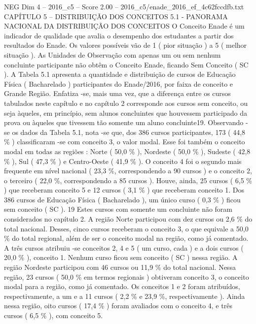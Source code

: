 \begin{textsample}{NEG Dim 4 – 2016\_c5 – Score 2.00 – 2016\_c5/enade\_2016\_ef\_4c62fccdfb.txt}  \label{ex:f4_neg_257}
CAPÍTULO 5 – DISTRIBUIÇÃO DOS CONCEITOS 5.1 - PANORAMA NACIONAL DA DISTRIBUIÇÃO DOS CONCEITOS O Conceito Enade é um indicador de qualidade que avalia o desempenho dos estudantes a partir dos resultados do Enade.
Os valores possíveis vão de 1 ( pior situação ) a 5 ( melhor situação ).
As Unidades de Observação com apenas um ou sem nenhum concluinte participante não obtêm o Conceito Enade, ficando Sem Conceito ( SC ).
A Tabela 5.1 apresenta a quantidade e distribuição de cursos de Educação Física ( Bacharelado ) participantes do Enade/2016, por faixa de conceito e Grande Região.
Enfatiza -se, mais uma vez, que a diferença entre os cursos tabulados neste capítulo e no capítulo 2 corresponde aos cursos sem conceito, ou seja àqueles, em princípio, sem alunos concluintes que houvessem participado da prova ou àqueles que tivessem tão somente um aluno concluinte19.
Observando -se os dados da Tabela 5.1, nota -se que, dos 386 cursos participantes, 173 ( 44,8 \% ) classificaram -se com conceito 3, o valor modal.
Esse foi também o conceito modal em todas as regiões : Norte ( 50,0 \% ), Nordeste ( 50,0 \% ), Sudeste ( 42,8 \% ), Sul ( 47,3 \% ) e Centro-Oeste ( 41,9 \% ).
O conceito 4 foi o segundo mais frequente em nível nacional ( 23,3 \%, correspondendo a 90 cursos ) e o conceito 2, o terceiro ( 22,0 \%, correspondendo a 85 cursos ).
Houve, ainda, 25 cursos ( 6,5 \% ) que receberam conceito 5 e 12 cursos ( 3,1 \% ) que receberam conceito 1.
Dos 386 cursos de Educação Física ( Bacharelado ), um único curso ( 0,3 \% ) ficou sem conceito ( SC ). 19 Estes cursos com somente um concluinte não foram considerados no capítulo 2.
A região Norte participou com dez cursos ou 2,6 \% do total nacional.
Desses, cinco cursos receberam o conceito 3, o que equivale a 50,0 \% do total regional, além de ser o conceito modal na região, como já comentado.
A três cursos atribuiu -se conceitos 2, 4 e 5 ( um curso, cada ) e a dois cursos ( 20,0 \% ), conceito 1.
Nenhum curso ficou sem conceito ( SC ) nessa região.
A região Nordeste participou com 46 cursos ou 11,9 \% do total nacional.
Nessa região, 23 cursos ( 50,0 \% em termos regionais ) obtiveram conceito 3, o conceito modal para a região, como já comentado.
Os conceitos 1 e 2 foram atribuídos, respectivamente, a um e a 11 cursos ( 2,2 \% e 23,9 \%, respectivamente ).
Ainda nessa região, oito cursos ( 17,4 \% ) foram avaliados com o conceito 4, e três cursos ( 6,5 \% ), com conceito 5.

\end{textsample}
